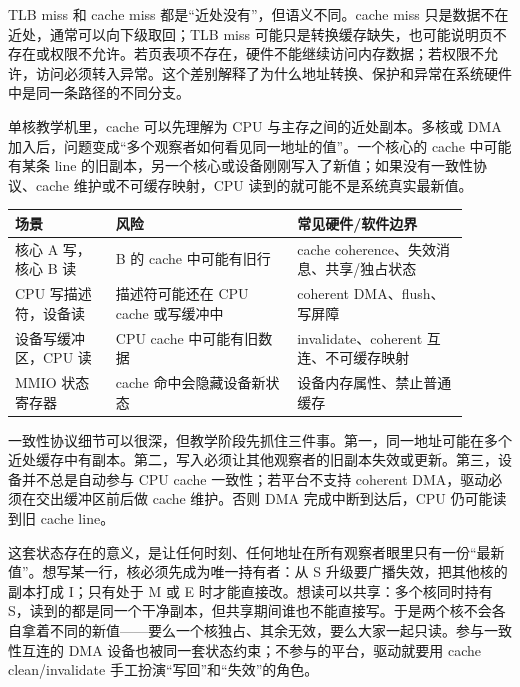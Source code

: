 TLB miss 和 cache miss 都是“近处没有”，但语义不同。cache miss 只是数据不在近处，通常可以向下级取回；TLB miss 可能只是转换缓存缺失，也可能说明页不存在或权限不允许。若页表项不存在，硬件不能继续访问内存数据；若权限不允许，访问必须转入异常。这个差别解释了为什么地址转换、保护和异常在系统硬件中是同一条路径的不同分支。

单核教学机里，cache 可以先理解为 CPU 与主存之间的近处副本。多核或 DMA 加入后，问题变成“多个观察者如何看见同一地址的值”。一个核心的 cache 中可能有某条 line 的旧副本，另一个核心或设备刚刚写入了新值；如果没有一致性协议、cache 维护或不可缓存映射，CPU 读到的就可能不是系统真实最新值。

\begin{longtable}{L{0.2\linewidth}L{0.36\linewidth}L{0.34\linewidth}}
\toprule
场景 & 风险 & 常见硬件/软件边界 \\
\midrule
核心 A 写，核心 B 读 & B 的 cache 中可能有旧行 & cache coherence、失效消息、共享/独占状态 \\\tablerowrule
CPU 写描述符，设备读 & 描述符可能还在 CPU cache 或写缓冲中 & coherent DMA、flush、写屏障 \\\tablerowrule
设备写缓冲区，CPU 读 & CPU cache 中可能有旧数据 & invalidate、coherent 互连、不可缓存映射 \\\tablerowrule
MMIO 状态寄存器 & cache 命中会隐藏设备新状态 & 设备内存属性、禁止普通缓存 \\
\bottomrule
\end{longtable}

一致性协议细节可以很深，但教学阶段先抓住三件事。第一，同一地址可能在多个近处缓存中有副本。第二，写入必须让其他观察者的旧副本失效或更新。第三，设备并不总是自动参与 CPU cache 一致性；若平台不支持 coherent DMA，驱动必须在交出缓冲区前后做 cache 维护。否则 DMA 完成中断到达后，CPU 仍可能读到旧 cache line。

这套状态存在的意义，是让任何时刻、任何地址在所有观察者眼里只有一份“最新值”。想写某一行，核必须先成为唯一持有者：从 S 升级要广播失效，把其他核的副本打成 I；只有处于 M 或 E 时才能直接改。想读可以共享：多个核同时持有 S，读到的都是同一个干净副本，但共享期间谁也不能直接写。于是两个核不会各自拿着不同的新值——要么一个核独占、其余无效，要么大家一起只读。参与一致性互连的 DMA 设备也被同一套状态约束；不参与的平台，驱动就要用 cache clean/invalidate 手工扮演“写回”和“失效”的角色。

